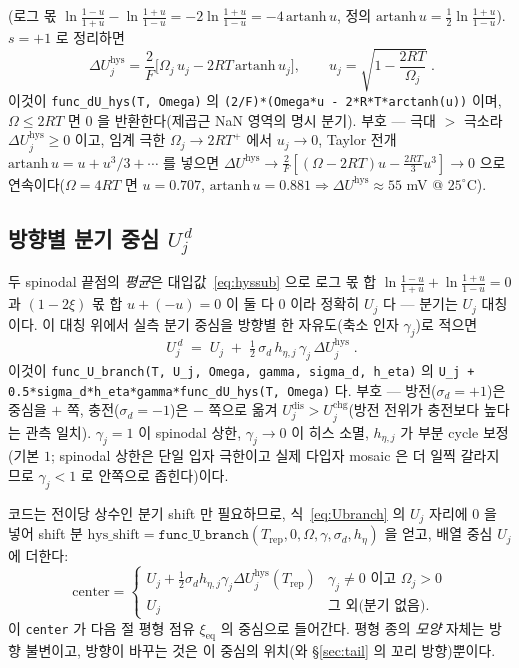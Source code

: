 \documentclass[11pt,a4paper]{article}
\newcommand{\eq}{\mathrm{eq}}
\newcommand{\dis}{\mathrm{dis}}
\newcommand{\chg}{\mathrm{chg}}
\newcommand{\hys}{\mathrm{hys}}
\newcommand{\rep}{\mathrm{rep}}
\newcommand{\code}[1]{\texttt{#1}}
\begin{document}
(로그 몫 $\ln\frac{1-u}{1+u}-\ln\frac{1+u}{1-u}=-2\ln\frac{1+u}{1-u}=-4\,\mathrm{artanh}\,u$, 정의
$\mathrm{artanh}\,u=\tfrac12\ln\tfrac{1+u}{1-u}$). $s=+1$ 로 정리하면
\begin{equation}
\boxed{\;\Delta U_j^\hys
=\frac{2}{F}\Big[\Omega_j\,u_j-2RT\,\mathrm{artanh}\,u_j\Big],
\qquad u_j=\sqrt{1-\frac{2RT}{\Omega_j}}\;.}
\label{eq:dUhys}
\end{equation}
이것이 \code{func\_dU\_hys(T, Omega)} 의 \code{(2/F)*(Omega*u - 2*R*T*arctanh(u))} 이며, $\Omega\le2RT$ 면 $0$ 을
반환한다(제곱근 NaN 영역의 명시 분기). 부호 --- 극대 $>$ 극소라 $\Delta U_j^\hys\ge0$ 이고, 임계 극한
$\Omega_j\to2RT^+$ 에서 $u_j\to0$, Taylor 전개 $\mathrm{artanh}\,u=u+u^3/3+\cdots$ 를 넣으면
$\Delta U^\hys\to\tfrac{2}{F}[(\Omega-2RT)u-\tfrac{2RT}{3}u^3]\to0$ 으로 연속이다($\Omega=4RT$ 면 $u=0.707$,
$\mathrm{artanh}\,u=0.881\Rightarrow\Delta U^\hys\approx55$ mV @ $25^\circ$C).

\subsection{방향별 분기 중심 $U_j^{\,d}$}
두 spinodal 끝점의 \emph{평균}은 대입값~\eqref{eq:hyssub} 으로 로그 몫 합 $\ln\tfrac{1-u}{1+u}+\ln\tfrac{1+u}{1-u}=0$
과 $(1-2\xi)$ 몫 합 $u+(-u)=0$ 이 둘 다 $0$ 이라 정확히 $U_j$ 다 --- 분기는 $U_j$ 대칭이다. 이 대칭 위에서 실측 분기
중심을 방향별 한 자유도(축소 인자 $\gamma_j$)로 적으면
\begin{equation}
\boxed{\;U_j^{\,d}\;=\;U_j\;+\;\tfrac12\,\sigma_d\,h_{\eta,j}\,\gamma_j\,\Delta U_j^\hys\;.}
\label{eq:Ubranch}
\end{equation}
이것이 \code{func\_U\_branch(T, U\_j, Omega, gamma, sigma\_d, h\_eta)} 의
\code{U\_j + 0.5*sigma\_d*h\_eta*gamma*func\_dU\_hys(T, Omega)} 다. 부호 --- 방전($\sigma_d=+1$)은 중심을 $+$ 쪽,
충전($\sigma_d=-1$)은 $-$ 쪽으로 옮겨 $U_j^{\dis}>U_j^{\chg}$(방전 전위가 충전보다 높다는 관측 일치). $\gamma_j=1$ 이
spinodal 상한, $\gamma_j\to0$ 이 히스 소멸, $h_{\eta,j}$ 가 부분 cycle 보정(기본 $1$; spinodal 상한은 단일 입자 극한이고
실제 다입자 mosaic 은 더 일찍 갈라지므로 $\gamma_j<1$ 로 안쪽으로 좁힌다)이다.

코드는 전이당 상수인 분기 shift 만 필요하므로, 식~\eqref{eq:Ubranch} 의 $U_j$ 자리에 $0$ 을 넣어 shift 분
$\mathrm{hys\_shift}=\code{func\_U\_branch}(T_\rep,0,\Omega,\gamma,\sigma_d,h_\eta)$ 을 얻고, 배열 중심 $U_j$ 에 더한다:
\begin{equation}
\mathrm{center}=
\begin{cases}
U_j+\tfrac12\sigma_d h_{\eta,j}\gamma_j\Delta U_j^\hys(T_\rep) & \gamma_j\ne0 \text{ 이고 } \Omega_j>0\\[2pt]
U_j & \text{그 외(분기 없음)}.
\end{cases}
\label{eq:center}
\end{equation}
이 \code{center} 가 다음 절 평형 점유 $\xi_\eq$ 의 중심으로 들어간다. 평형 종의 \emph{모양} 자체는 방향 불변이고,
방향이 바꾸는 것은 이 중심의 위치(와 \S\ref{sec:tail} 의 꼬리 방향)뿐이다.
\end{document}
